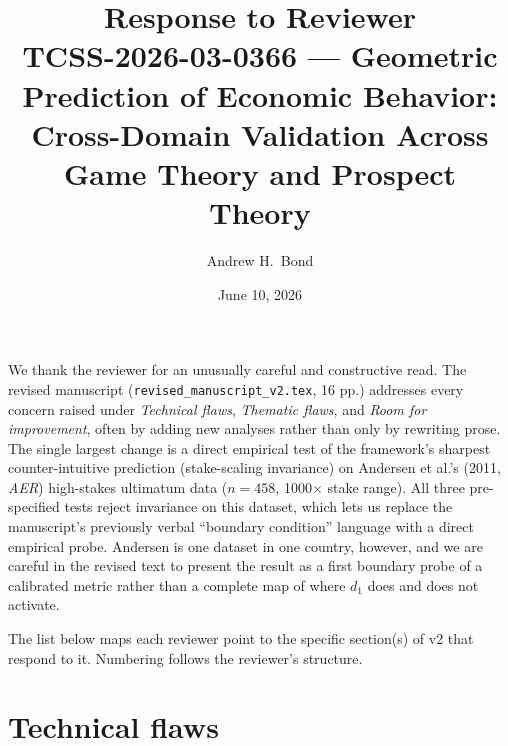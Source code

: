\documentclass[11pt]{article}
\title{Response to Reviewer \\
\large TCSS-2026-03-0366 — Geometric Prediction of Economic Behavior:\\
Cross-Domain Validation Across Game Theory and Prospect Theory}
\author{Andrew H.\ Bond}
\date{June 10, 2026}
\begin{document}
\maketitle

We thank the reviewer for an unusually careful and constructive read. The revised manuscript
(\texttt{revised\_manuscript\_v2.tex}, 16 pp.) addresses every concern raised under
\emph{Technical flaws}, \emph{Thematic flaws}, and \emph{Room for improvement}, often by
adding new analyses rather than only by rewriting prose. The single largest change is a
direct empirical test of the framework's sharpest counter-intuitive prediction
(stake-scaling invariance) on Andersen et al.'s (2011, \emph{AER}) high-stakes ultimatum
data ($n=458$, 1000$\times$ stake range). All three pre-specified tests reject invariance
on this dataset, which lets us replace the manuscript's previously verbal
``boundary condition'' language with a direct empirical probe. Andersen is one dataset
in one country, however, and we are careful in the revised text to present the result
as a first boundary probe of a calibrated metric rather than a complete map of where
$d_1$ does and does not activate.

The list below maps each reviewer point to the specific section(s) of v2 that respond to it.
Numbering follows the reviewer's structure.

\section*{Technical flaws}
\end{document}
